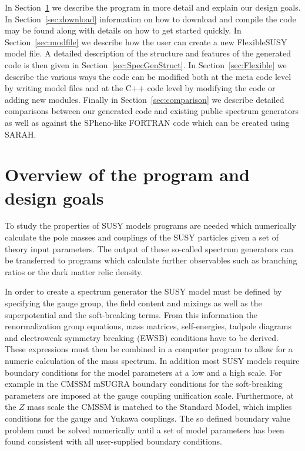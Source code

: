 \documentclass[final,3p,11pt,pdflatex]{elsarticle}
\makeatletter
\newcommand{\fs}{FlexibleSUSY\@\xspace}
\newcommand{\secref}[1]{Section~\ref{#1}}
\makeatother
\begin{document}
In \secref{sec:Program} we describe the program in more detail and
explain our design goals.  In \secref{sec:download} information on how
to download and compile the code may be found along with details on
how to get started quickly.  In \secref{sec:modfile} we describe how
the user can create a new \fs model file. A detailed
description of the structure and features of the generated code is
then given in \secref{sec:SpecGenStruct}.  In \secref{sec:Flexible} we
describe the various ways the code can be modified both at the meta
code level by writing model files and at the C++ code level by
modifying the code or adding new modules. Finally in
\secref{sec:comparison} we describe detailed comparisons between our
generated code and existing public spectrum generators as well as
against the SPheno-like FORTRAN code which can be created using SARAH.


\section{Overview of the program and design goals}
\label{sec:Program}

To study the properties of SUSY models programs are needed which
numerically calculate the pole masses and couplings of the SUSY
particles given a set of theory input parameters.  The output of these
so-called spectrum generators can be transferred to programs which
calculate further observables such as branching ratios or the dark
matter relic density.

In order to create a spectrum generator the SUSY model must be defined
by specifying the gauge group, the field content and mixings as well
as the superpotential and the soft-breaking terms.  From this
information the renormalization group equations, mass matrices,
self-energies, tadpole diagrams and electroweak symmetry breaking
(EWSB) conditions have to be derived.  These expressions must then be
combined in a computer program to allow for a numeric calculation of
the mass spectrum.  In addition most SUSY models require boundary
conditions for the model parameters at a low and a high scale.  For
example in the CMSSM mSUGRA boundary conditions for the soft-breaking
parameters are imposed at the gauge coupling unification scale.
Furthermore, at the $Z$ mass scale the CMSSM is matched to the Standard
Model, which implies conditions for the gauge and Yukawa couplings.
The so defined boundary value problem must be solved numerically until
a set of model parameters has been found consistent with all
user-supplied boundary conditions.
\end{document}
